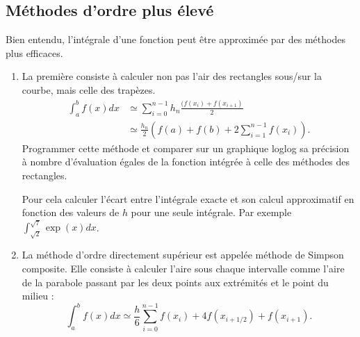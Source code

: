 \subsection{Méthodes d'ordre plus élevé}
Bien entendu, l'intégrale d'une fonction peut être approximée par des méthodes plus efficaces. 
\begin{enumerate}
\item La première consiste à calculer non pas l'air des rectangles 
sous/sur la courbe,
mais celle des trapèzes. 
\begin{equation}
\begin{split}
\int_a^b f(x)dx &\simeq \sum_{i=0}^{n-1} h_n \frac{(f(x_i)+f(x_{i+1})}{2}\\
                &\simeq \frac{h_n}{2} \left(f(a)+f(b)
+ 2\sum_{i=1}^{n-1} f(x_i) \right).
\end{split}
\end{equation}
Programmer cette méthode et comparer sur un graphique loglog 
sa précision à nombre d'évaluation égales
de la fonction intégrée à celle des méthodes des rectangles. 

Pour cela calculer l'écart entre l'intégrale exacte et son calcul approximatif en fonction des valeurs de $h$ pour une seule intégrale. Par exemple $\int_{\sqrt{2}}^{\sqrt{7}} \exp(x) dx$.
\item La méthode d'ordre directement supérieur est appelée méthode de Simpson composite.
Elle consiste à calculer l'aire sous chaque intervalle comme l'aire de la parabole passant par les deux points aux extrémités et le point du milieu : 
\begin{equation}
\int_a^b f(x)dx \simeq  \frac{h}{6}\sum_{i=0}^{n-1} f(x_i) + 4 f(x_{i+1/2}) + f(x_{i+1}) .
\end{equation}


\end{enumerate}
